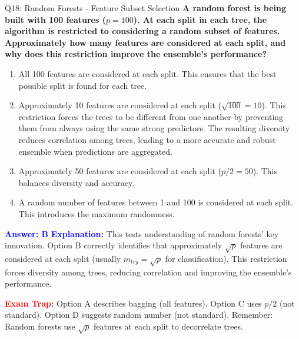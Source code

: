 \documentclass[8pt]{beamer}
\begin{document}
	\begin{frame}{Q18: Random Forests - Feature Subset Selection}
		\fontsize{6.5}{7.5}\selectfont
		\textbf{A random forest is being built with 100 features ($p = 100$). At each split in each tree, the algorithm is restricted to considering a random subset of features. Approximately how many features are considered at each split, and why does this restriction improve the ensemble's performance?}
		
		\begin{enumerate}
			\item All 100 features are considered at each split. This ensures that the best possible split is found for each tree.
			\item Approximately 10 features are considered at each split ($\sqrt{100} = 10$). This restriction forces the trees to be different from one another by preventing them from always using the same strong predictors. The resulting diversity reduces correlation among trees, leading to a more accurate and robust ensemble when predictions are aggregated.
			\item Approximately 50 features are considered at each split ($p/2 = 50$). This balances diversity and accuracy.
			\item A random number of features between 1 and 100 is considered at each split. This introduces the maximum randomness.
		\end{enumerate}
		
		\vspace{0.1cm}
		\textcolor{blue}{\textbf{Answer: B}}
		\vspace{0.1cm}
		\textcolor{blue}{\textbf{Explanation:}} This tests understanding of random forests' key innovation. Option B correctly identifies that approximately $\sqrt{p}$ features are considered at each split (usually $m_{try} = \sqrt{p}$ for classification). This restriction forces diversity among trees, reducing correlation and improving the ensemble's performance.
		
		\textcolor{red}{\textbf{Exam Trap:}} Option A describes bagging (all features). Option C uses $p/2$ (not standard). Option D suggests random number (not standard). Remember: Random forests use $\sqrt{p}$ features at each split to decorrelate trees.
	\end{frame}
	
\end{document}
